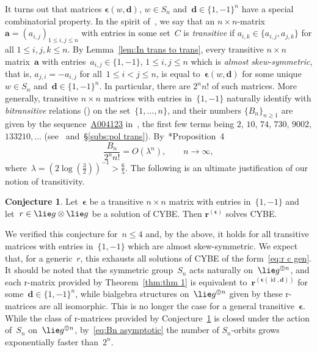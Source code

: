 \documentclass[12pt, reqno]{amsart}
\theoremstyle{definition}
\newtheorem{conjecture}[theorem]{Conjecture}
\numberwithin{equation}{section}
\newcommand{\tensor}{\otimes}
\DeclareMathOperator{\id}{id}
\begin{document}
It turns out that matrices
$\boldsymbol\epsilon(w,\boldsymbol d)$, $w\in S_n$
and~$\boldsymbol d\in\{1,-1\}^n$ have a special combinatorial property. In the spirit of~\cites{ABGJ,ABGJepr}, we say that an $n\times n$-matrix $\boldsymbol a=(a_{i,j})_{1\le i,j\le n}$
with entries in some set~$C$ is {\em transitive} if
$a_{i,k}\in\{a_{i,j},a_{j,k}\}$ for all $1\le i,j,k\le n$. By Lemma~\ref{lem:In trans to trans}, every transitive $n\times n$ matrix~$\boldsymbol{a}$
with entries~$a_{i,j}\in\{1,-1\}$, $1\le i,j\le n$ which is {\em almost skew-symmetric},
that is, $a_{j,i}=-a_{i,j}$ for all~$1\le i<j\le n$,
is equal to~$\boldsymbol{\epsilon}(w,\boldsymbol d)$
for some unique~$w\in S_n$ and~$\boldsymbol d\in\{1,-1\}^n$.
In particular, there are $2^nn!$ of such matrices. 
More generally, transitive $n\times n$ matrices
with entries in~$\{1,-1\}$ naturally identify with 
{\em bitransitive} relations (\cite{FZ}) on the set~$\{1,\dots,n\}$, and their numbers
$\{B_n\}_{n\ge 1}$ are given by the sequence~\href{https://oeis.org/A004123}{A004123} in~\cite{OEIS}, the first few terms being $2$, $10$, $74$, $730$, $9002$, $133210,\dots$ (see~\cites{FZ,HK,Wag} and~\S\ref{subs:pol trans}). By~\cite{FZ}*{Proposition~4}
\begin{equation}\label{eq:Bn asymptotic}
\frac{B_n}{2^n n!}=O(\lambda^n),\qquad n\to\infty,
\end{equation}
where~$\lambda=(2\log(\frac32))^{-1}>\frac65$.
The following is an ultimate justification of our notion of transitivity.
\begin{conjecture}\label{conj:CYBE for trans 1,-1}
Let~$\boldsymbol{\epsilon}$ be a
transitive $n\times n$ matrix with entries in~$\{1,-1\}$
and let~$r\in \lie g\tensor \lie g$
be a solution of CYBE. 
Then $\mathbf r^{(\boldsymbol{\epsilon})}$ solves CYBE.
\end{conjecture}
We verified this conjecture for~$n\le 4$ and, by the above, it holds for all transitive matrices with entries in~$\{1,-1\}$ which are almost skew-symmetric.
We expect that, for a generic~$r$, this exhausts all solutions of CYBE of the form~\eqref{eq:r c gen}. It should be noted that the symmetric group~$S_n$ acts
naturally on~$\lie g^{\oplus n}$, and each r-matrix
provided by Theorem~\ref{thm:thm 1} is equivalent
to~$\mathbf r^{(\boldsymbol{\epsilon}(\id,\boldsymbol d))}$ for some~$\boldsymbol d\in\{1,-1\}^n$, while
bialgebra structures on~$\lie g^{\oplus n}$ given by these r-matrices are all isomorphic. 
This is no longer the case for a general transitive~$\boldsymbol\epsilon$. While the class of r-matrices provided by Conjecture~\ref{conj:CYBE for trans 1,-1} is closed under the action of~$S_n$ on~$\lie g^{\oplus n}$, by~\eqref{eq:Bn asymptotic} the number of $S_n$-orbits grows exponentially faster than~$2^n$.
\end{document}
